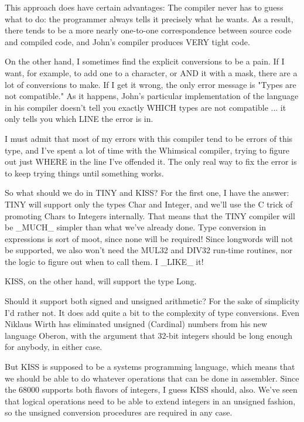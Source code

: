 \documentclass[float=false, crop=false]{standalone}
\begin{document}
This approach does have certain advantages: The compiler never has to guess what
to do: the programmer always tells it precisely what he wants. As a result,
there tends to be a more nearly one-to-one correspondence between source code
and compiled code, and John's compiler produces VERY tight code.

On the other hand, I sometimes find the explicit conversions to be a pain. If I
want, for example, to add one to a character, or AND it with a mask, there are a
lot of conversions to make. If I get it wrong, the only error message is "Types
are not compatible." As it happens, John's particular implementation of the
language in his compiler doesn't tell you exactly WHICH types are not compatible
... it only tells you which LINE the error is in.

I must admit that most of my errors with this compiler tend to be errors of this
type, and I've spent a lot of time with the Whimsical compiler, trying to figure
out just WHERE in the line I've offended it. The only real way to fix the error
is to keep trying things until something works.

So what should we do in TINY and KISS? For the first one, I have the answer:
TINY will support only the types Char and Integer, and we'll use the C trick of
promoting Chars to Integers internally. That means that the TINY compiler will
be _MUCH_ simpler than what we've already done. Type conversion in expressions
is sort of moot, since none will be required! Since longwords will not be
supported, we also won't need the MUL32 and DIV32 run-time routines, nor the
logic to figure out when to call them. I _LIKE_ it!

KISS, on the other hand, will support the type Long.

Should it support both signed and unsigned arithmetic? For the sake of
simplicity I'd rather not. It does add quite a bit to the complexity of type
conversions. Even Niklaus Wirth has eliminated unsigned (Cardinal) numbers from
his new language Oberon, with the argument that 32-bit integers should be long
enough for anybody, in either case.

But KISS is supposed to be a systems programming language, which means that we
should be able to do whatever operations that can be done in assembler. Since
the 68000 supports both flavors of integers, I guess KISS should, also. We've
seen that logical operations need to be able to extend integers in an unsigned
fashion, so the unsigned conversion procedures are required in any case.
\end{document}
